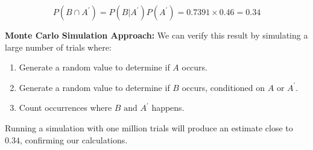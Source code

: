 \documentclass[journal]{IEEEtran}
\begin{document}
\[
P(B \cap A^\prime) = P(B | A^\prime) P(A^\prime) = 0.7391 \times 0.46 = 0.34
\]

\textbf{Monte Carlo Simulation Approach:} We can verify this result by simulating a large number of trials where:
\begin{enumerate}
    \item Generate a random value to determine if \( A \) occurs.
    \item Generate a random value to determine if \( B \) occurs, conditioned on \( A \) or \( A^\prime \).
    \item Count occurrences where \( B \text{ and } A^\prime \) happens.
\end{enumerate}

Running a simulation with one million trials will produce an estimate close to \( 0.34 \), confirming our calculations.
\end{document}
